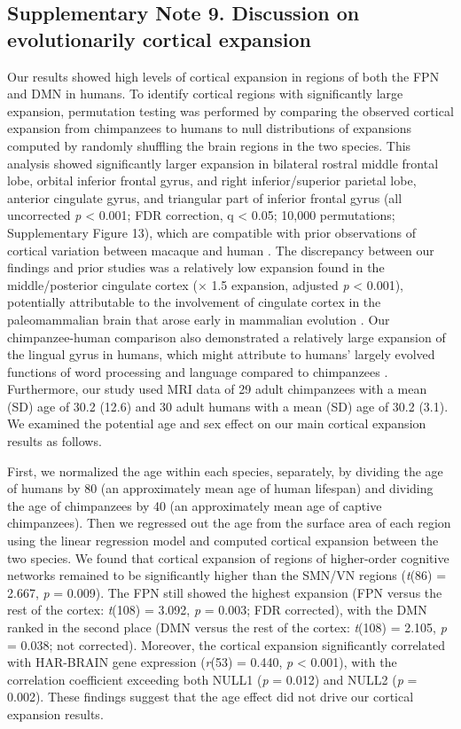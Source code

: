 \begin{refsection}
\subsection*{Supplementary Note 9. Discussion on evolutionarily cortical expansion}
Our results showed high levels of cortical expansion in regions of both the FPN and DMN in humans. To identify cortical regions with significantly large expansion, permutation testing was performed by comparing the observed cortical expansion from chimpanzees to humans to null distributions of expansions computed by randomly shuffling the brain regions in the two species. This analysis showed significantly larger expansion in bilateral rostral middle frontal lobe, orbital inferior frontal gyrus, and right inferior/superior parietal lobe, anterior cingulate gyrus, and triangular part of inferior frontal gyrus (all uncorrected \textit{p} < 0.001; FDR correction, q < 0.05; 10,000 permutations; Supplementary Figure 13), which are compatible with prior observations of cortical variation between macaque and human \citep{donahue2018quantitative,hill2010similar}. The discrepancy between our findings and prior studies \citep{donahue2018quantitative,hill2010similar} was a relatively low expansion found in the middle/posterior cingulate cortex ($ \times $ 1.5 expansion, adjusted \textit{p} < 0.001), potentially attributable to the involvement of cingulate cortex in the paleomammalian brain that arose early in mammalian evolution \citep{Reiner1990TheTB}. Our chimpanzee-human comparison also demonstrated a relatively large expansion of the lingual gyrus in humans, which might attribute to humans’ largely evolved functions of word processing and language compared to chimpanzees \citep{Mechelli2000DifferentialEO}. Furthermore, our study used MRI data of 29 adult chimpanzees with a mean (SD) age of 30.2 (12.6) and 30 adult humans with a mean (SD) age of 30.2 (3.1). We examined the potential age and sex effect on our main cortical expansion results as follows.

First, we normalized the age within each species, separately, by dividing the age of humans by 80 (an approximately mean age of human lifespan) and dividing the age of chimpanzees by 40 (an approximately mean age of captive chimpanzees). Then we regressed out the age from the surface area of each region using the linear regression model and computed cortical expansion between the two species. We found that cortical expansion of regions of higher-order cognitive networks remained to be significantly higher than the SMN/VN regions (\textit{t}(86) = 2.667, \textit{p} = 0.009). The FPN still showed the highest expansion (FPN versus the rest of the cortex: \textit{t}(108) = 3.092, \textit{p} = 0.003; FDR corrected), with the DMN ranked in the second place (DMN versus the rest of the cortex: \textit{t}(108) = 2.105, \textit{p} = 0.038; not corrected). Moreover, the cortical expansion significantly correlated with HAR-BRAIN gene expression (\textit{r}(53) = 0.440, \textit{p} < 0.001), with the correlation coefficient exceeding both NULL1 (\textit{p} = 0.012) and NULL2 (\textit{p} = 0.002). These findings suggest that the age effect did not drive our cortical expansion results.


\end{refsection}
